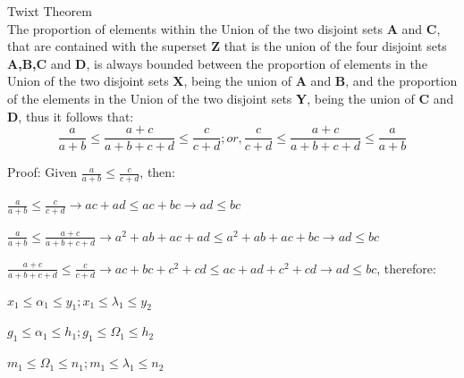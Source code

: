\newpage
\begin{theorem}{Twixt Theorem}\\
The proportion of elements within the Union of the two disjoint sets \textbf{A} and \textbf{C}, that are contained with the superset \textbf{Z} that is the union of the four disjoint sets \textbf{A,B,C} and \textbf{D}, is always bounded between the proportion of elements in the Union of the two disjoint sets \textbf{X}, being the union of  \textbf{A} and \textbf{B}, and the proportion of the elements in the Union of the two disjoint sets \textbf{Y}, being the union of  \textbf{C} and \textbf{D}, thus it follows that:
$$\frac{a}{a+b}\le\frac{a+c}{a+b+c+d}\le\frac{c}{c+d}; or, \frac{c}{c+d}\le\frac{a+c}{a+b+c+d}\le\frac{a}{a+b}$$

Proof:
Given $\frac{a}{a+b}\le\frac{c}{c+d}$, then:

$\frac{a}{a+b}\le\frac{c}{c+d} \rightarrow ac+ad\le ac+bc \rightarrow ad\le bc$

$\frac{a}{a+b}\le\frac{a+c}{a+b+c+d} \rightarrow a^2+ab+ac+ad\le a^2+ab+ac+bc \rightarrow ad\le bc$

$\frac{a+c}{a+b+c+d}\le\frac{c}{c+d} \rightarrow ac+bc+c^2+cd\le ac+ad+c^2+cd \rightarrow ad\le bc$, therefore:

$x_{1} \le \alpha_{1} \le y_{1}; x_{1} \le \lambda_{1} \le y_{2}$

$g_{1} \le \alpha_{1} \le h_{1}; g_{1} \le \Omega_{1} \le h_{2}$

$m_{1} \le \Omega_{1} \le n_{1}; m_{1} \le \lambda_{1} \le n_{2}$
\end{theorem}

